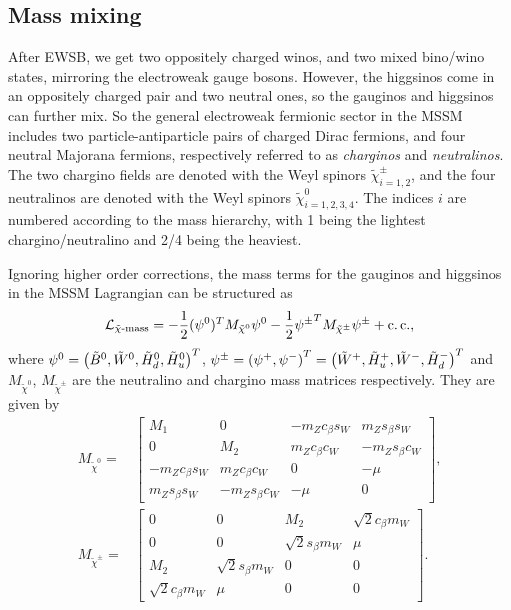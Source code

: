 \documentclass[../main.tex]{subfiles}
\begin{document}
\subsection{Mass mixing}
After EWSB, we get two oppositely charged winos, and two mixed bino/wino states, mirroring the electroweak gauge bosons.
However, the higgsinos come in an oppositely charged pair and two neutral ones, so the gauginos and higgsinos can further mix.
So the general electroweak fermionic sector in the MSSM includes two particle-antiparticle pairs of charged Dirac fermions, and four neutral Majorana fermions, respectively referred to as \emph{charginos} and \emph{neutralinos}.
The two chargino fields are denoted with the Weyl spinors \(\tilde\chi_{i=1,2}^\pm\), and the four neutralinos are denoted with the Weyl spinors \(\tilde\chi_{i=1,2,3,4}^0\).
The indices \(i\) are numbered according to the mass hierarchy, with 1 being the lightest chargino/neutralino and 2/4 being the heaviest.

Ignoring higher order corrections, the mass terms for the gauginos and higgsinos in the MSSM Lagrangian can be structured as
\begin{equation}
  \mathcal{L}_{\tilde\chi\text{-mass}} = -\frac{1}{2}(\psi^0)^T M_{\tilde\chi^0} \psi^0 - \frac{1}{2}{\psi^\pm}^T M_{\tilde\chi^\pm} \psi^\pm + \operatorname{c.c.},
\end{equation}
where \(\psi^0 = \left(\tilde{B}^0, \tilde{W}^0, \tilde{H}^0_d, \tilde{H}^0_u\right)^T\), \(\psi^\pm = \left(\psi^+, \psi^-\right)^T = \left(\tilde{W}^+, \tilde{H}_u^+, \tilde{W}^-, \tilde{H}_d^-\right)^T\) and \(M_{\tilde\chi^0}\), \(M_{\tilde\chi^\pm}\) are the neutralino and chargino mass matrices respectively.
They are given by
\begin{align}
  M_{\tilde\chi^0} =   & \begin{bmatrix}
                           M_1              & 0                & -m_Z c_\beta s_W & m_Z s_\beta s_W  \\
                           0                & M_2              & m_Z c_\beta c_W  & -m_Z s_\beta c_W \\
                           -m_Z c_\beta s_W & m_Z c_\beta c_W  & 0                & -\mu             \\
                           m_Z s_\beta s_W  & -m_Z s_\beta c_W & -\mu             & 0
                         \end{bmatrix},             \\
  M_{\tilde\chi^\pm} = & \begin{bmatrix}
                           0                   & 0                   & M_2                 & \sqrt{2}c_\beta m_W \\
                           0                   & 0                   & \sqrt{2}s_\beta m_W & \mu                 \\
                           M_2                 & \sqrt{2}s_\beta m_W & 0                   & 0                   \\
                           \sqrt{2}c_\beta m_W & \mu                 & 0                   & 0
                         \end{bmatrix}.
\end{align}
\end{document}
